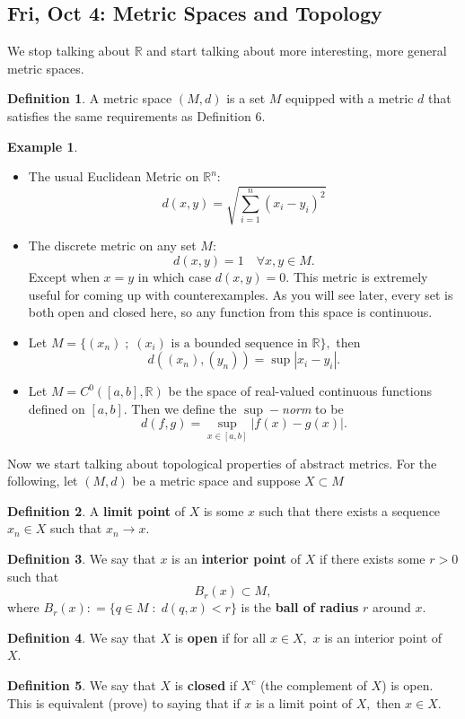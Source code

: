 \documentclass[10pt, oneside]{article}
\newcommand{\bbR}{\mathbb{R}}
\theoremstyle{definition}
\newtheorem{exmp}{Example}[section]
\newtheorem{defn}{Definition}
\begin{document}
\subsection{Fri, Oct 4: Metric Spaces and Topology}
We stop talking about $\bbR$ and start talking about more interesting, more general metric spaces. 
\begin{defn}
    A metric space $(M, d)$ is a set $M$ equipped with a metric $d$ that satisfies the same requirements as Definition 6.
\end{defn}
\begin{exmp}
    \begin{itemize}
        \item The usual Euclidean Metric on $\bbR^n$:
        \[d(x,y) = \sqrt{\sum_{i=1}^n(x_i - y_i)^2}\]
        \item The discrete metric on any set $M:$
        \[d(x,y) = 1 \quad \forall x,y \in M.\] Except when $x=y$ in which case $d(x,y) = 0.$ This metric is extremely useful for coming up with counterexamples. As you will see later, every set is both open and closed here, so any function from this space is continuous.
        \item Let $M  = \{(x_n) \; ; \; \text{$(x_i)$ is a bounded sequence in }\bbR\},$ then 
        \[d((x_n), (y_n)) = \sup|x_i - y_i|.\]
        \item Let $M = C^0([a,b], \bbR)$ be the space of real-valued continuous functions defined on $[a,b].$ Then we define the \textit{$\sup-$norm} to be
        \[d(f,g) = \sup_{x\in [a,b]}|f(x) - g(x)|.\]
    \end{itemize}
\end{exmp}
Now we start talking about topological properties of abstract metrics. For the following, let $(M,d)$ be a metric space and suppose $X \subset M$
\begin{defn}
    A \textbf{limit point} of $X$ is some $x$ such that there exists a sequence $x_n \in X$ such that $x_n \to x.$
\end{defn}
\begin{defn}
    We say that $x$ is an \textbf{interior point} of $X$ if there exists some $r>0$ such that 
    \[B_r(x) \subset M,\] where $B_r(x): = \{q \in M \; : \; d(q,x)< r\}$ is the \textbf{ball of radius} $r$ around $x.$
\end{defn}
\begin{defn}
We say that $X$ is \textbf{open} if for all $x\in X,$ $x$ is an interior point of $X.$
\end{defn}
\begin{defn}
    We say that $X$ is \textbf{closed} if $X^c$ (the complement of $X$) is open. This is equivalent (prove) to saying that if $x$ is a limit point of $X,$ then $x\in X.$
\end{defn}
\end{document}
